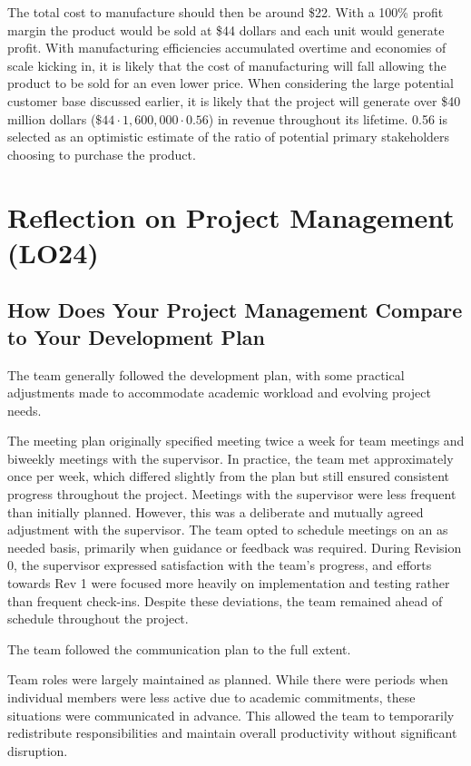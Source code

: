 \documentclass{article}
\begin{document}
The total cost to manufacture should then be around \$22. With a 100\% profit 
margin the product would be sold at \$44 dollars and each unit would generate
profit. With manufacturing efficiencies accumulated overtime and economies of 
scale kicking in, it is likely that the cost of manufacturing will fall allowing
the product to be sold for an even lower price. When considering the large 
potential customer base discussed earlier, it is likely that the project will 
generate over \$40 million dollars (\(\$44 \cdot 1,600,000 \cdot 0.56 \))
in revenue throughout its lifetime. 0.56 is selected as an optimistic estimate
of the ratio of potential primary stakeholders choosing to purchase the product.

\section{Reflection on Project Management (LO24)}

\subsection{How Does Your Project Management Compare to Your Development Plan}

The team generally followed the development plan, with some practical
adjustments made to accommodate academic workload and evolving project needs.

The meeting plan originally specified meeting twice a week for team meetings
and biweekly meetings with the supervisor. In practice, the team met
approximately once per week, which differed slightly from the plan but still
ensured consistent progress throughout the project. Meetings with the
supervisor were less frequent than initially planned. However, this was a
deliberate and mutually agreed adjustment with the supervisor. The team opted to
schedule meetings on an as needed basis, primarily when guidance or feedback was
required. During Revision 0, the supervisor expressed satisfaction with the
team's progress, and efforts towards Rev 1 were focused more heavily on
implementation and testing rather than frequent check-ins. Despite these
deviations, the team remained ahead of schedule throughout the project.

The team followed the communication plan to the full extent.

Team roles were largely maintained as planned. While there were periods when
individual members were less active due to academic commitments,
these situations were communicated in advance. This allowed the team to
temporarily redistribute responsibilities and maintain overall productivity
without significant disruption.
\end{document}
